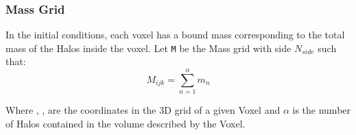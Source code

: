 



\subsubsection{Mass Grid}
\label{sec:INTROMgrid}
In the initial conditions, each voxel has a bound mass corresponding to the total mass of the Halos inside the voxel. Let \texttt{M} be the \textbf{}{Mass grid} with side $N_{side}$ such that:
\begin{equation}
    M_{ijk}=\sum\limits_{n=1}^{\alpha} m_n 
\end{equation}

Where , ,  are the coordinates in the 3D grid of a given Voxel and $\alpha$ is the number of Halos contained in the volume described by the Voxel. 


